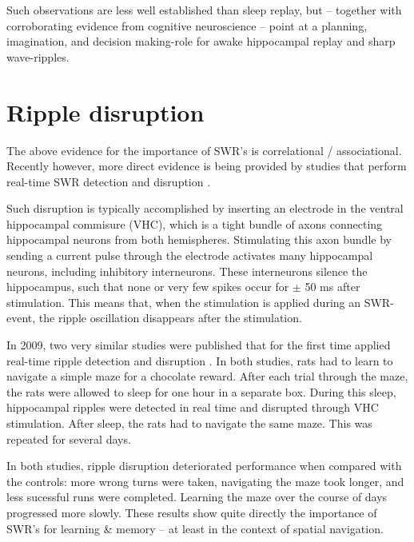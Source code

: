 Such observations are less well established than sleep replay, but -- together with corroborating evidence from cognitive neuroscience\footnotemark{} -- point at a planning, imagination, and decision making-role for awake hippocampal replay and sharp wave-ripples.





\section{Ripple disruption}
\label{sec:disruption}

The above evidence for the importance of SWR's is correlational / associational. Recently however, more direct evidence is being provided by studies that perform real-time SWR detection and disruption \cite{Ego-Stengel2009,Girardeau2009,Jadhav2012,Girardeau2014,Kovacs2016,Talakoub2016}.

Such disruption is typically accomplished by inserting an electrode in the ventral hippocampal commisure (VHC), which is a tight bundle of axons connecting hippocampal neurons from both hemispheres. Stimulating this axon bundle by sending a current pulse through the electrode activates many hippocampal neurons, including inhibitory interneurons. These interneurons silence the hippocampus, such that none or very few spikes occur for $\pm$ 50 ms after stimulation. This means that, when the stimulation is applied during an SWR-event, the ripple oscillation disappears after the stimulation.

In 2009, two very similar studies were published that for the first time applied real-time ripple detection and disruption \cite{Ego-Stengel2009,Girardeau2009}. In both studies, rats had to learn to navigate a simple maze for a chocolate reward. After each trial through the maze, the rats were allowed to sleep for one hour in a separate box. During this sleep, hippocampal ripples were detected in real time and disrupted through VHC stimulation. After sleep, the rats had to navigate the same maze. This was repeated for several days.

In both studies, ripple disruption deteriorated performance when compared with the controls:\footnotemark{} more wrong turns were taken, navigating the maze took longer, and less sucessful runs were completed. Learning the maze over the course of days progressed more slowly. These results show quite directly the importance of SWR's for learning \& memory -- at least in the context of spatial navigation.

